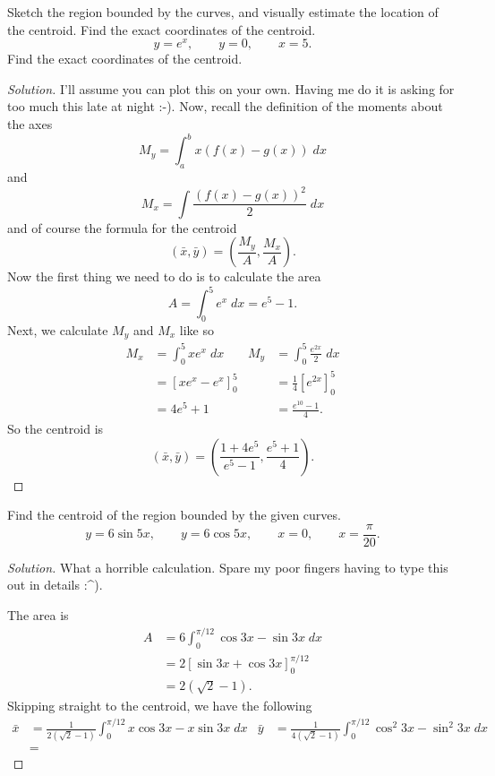 \begin{problem}
Sketch the region bounded by the curves, and visually estimate the location
of the centroid. Find the exact coordinates of the centroid.
\[
y=e^x,\qquad
y=0,\qquad
x=5.
\]
Find the exact coordinates of the centroid.
\end{problem}
\begin{proof}[Solution]
I'll assume you can plot this on your own. Having me do it is asking for
too much this late at night :-). Now, recall the definition of the moments
about the axes
\begin{equation}
\label{eq:moment-about-x-continuous}
M_y=\int_a^b x(f(x)-g(x))\;dx
\end{equation}
and
\begin{equation}
\label{eq:moment-about-y-continuous}
M_x=\int \frac{(f(x)-g(x))^2}{2}\;dx
\end{equation}
and of course the formula for the centroid
\begin{equation}
  \label{eq:center-of-mass}
(\bar x,\bar y)=\left(\frac{M_y}{A},\frac{M_x}{A}\right).
\end{equation}
Now the first thing we need to do is to calculate the area
\[
A=\int_0^5 e^x\;dx=e^5-1.
\]
Next, we calculate $M_y$ and $M_x$ like so
\begin{align*}
M_x&=\int_0^5 xe^x\;dx&M_y&=\int_0^5\frac{e^{2x}}{2}\;dx\\
&=\left[xe^x-e^x\right]_0^5&&=\frac{1}{4}\left[e^{2x}\right]_0^5\\
&=4e^5+1&&=\frac{e^{10}-1}{4}.
\end{align*}
So the centroid is
\[
\boxed{
(\bar x,\bar y)
=\left(\frac{1+4e^5}{e^5-1},\frac{e^5+1}{4}\right)
.
}
\]
\end{proof}

\begin{problem}
Find the centroid of the region bounded by the given curves.
\[
y=6\sin 5x,\qquad
y=6\cos 5x,\qquad
x=0,\qquad
x=\frac{\pi}{20}.
\]
\end{problem}
\begin{proof}[Solution]
What a horrible calculation. Spare my poor fingers having to type this out
in details :\textasciicircum).

The area is
\begin{align*}
A&=6\int_0^{\pi/12}\cos 3x-\sin 3x\;dx\\
 &=2\left[ \sin 3x+\cos 3x \right]_0^{\pi/12}\\
 &=\boxed{2(\sqrt{2}-1).}
\end{align*}
Skipping straight to the centroid, we have the following
\begin{align*}
\bar x&=\frac{1}{2(\sqrt{2}-1)}\int_0^{\pi/12}x\cos 3x-x\sin 3x\;dx&
\bar y&=\frac{1}{4(\sqrt{2}-1)}\int_0^{\pi/12}\cos^2 3x-\sin^2 3x\;dx\\
&=
\end{align*}
\end{proof}

